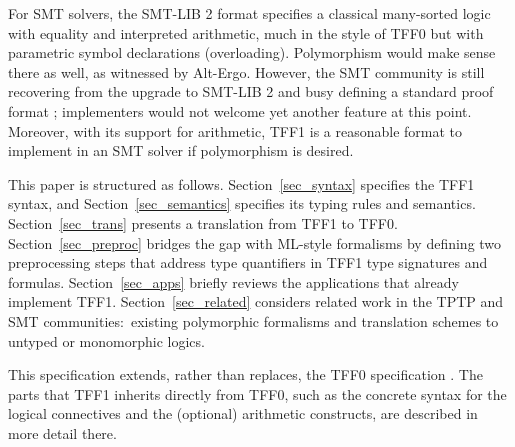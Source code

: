 For SMT solvers, the SMT-LIB 2 format \cite{barrett-et-al-2010} specifies a
classical many-sorted logic with equality and interpreted arithmetic, much in
the style of TFF0 but with parametric symbol declarations (overloading).
Polymorphism would make sense there as well, as witnessed by Alt-Ergo.
However, the SMT community is still recovering from the %
upgrade to SMT-LIB 2 and busy defining a standard proof format
\cite{besson-et-al-2011}; implementers would %
not welcome yet another
feature at this point. Moreover, with its support for arithmetic, TFF1 is a
reasonable format to implement in an SMT solver if polymorphism is desired.

\newcommand\cheat{\vskip0.3ex} %

This paper is structured as follows.
Section~\ref{sec_syntax} specifies the TFF1 syntax, and
Section~\ref{sec_semantics} specifies its typing rules and semantics.
Section~\ref{sec_trans} presents a translation from TFF1 to TFF0.
Section~\ref{sec_preproc} bridges the gap with ML-style formalisms by defining
two preprocessing steps that address type quantifiers in TFF1 type signatures
and formulas.
Section~\ref{sec_apps} briefly reviews the applications that already implement TFF1.
Section~\ref{sec_related} considers related work in the TPTP and SMT
communities:\ existing polymorphic formalisms and translation schemes
to untyped or monomorphic logics.

This specification extends, rather than replaces, the TFF0 specification
\cite{sutcliffe-et-al-2012-tff0}. The parts
that TFF1 inherits directly from TFF0, such as the
concrete syntax for the logical connectives and the
(optional) arithmetic constructs, are described in more detail there.
